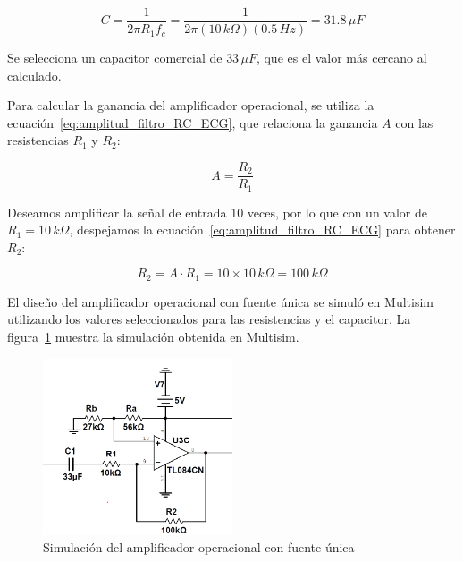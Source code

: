         \begin{equation}
            \label{eq:valor_capacitor}
            C = \frac{1}{2\pi R_1 f_c} = \frac{1}{2\pi (10\,k\Omega)(0.5\,Hz)} = 31.8\,\mu F
        \end{equation}

        Se selecciona un capacitor comercial de $33\,\mu F$, que es el valor más cercano al calculado.

        Para calcular la ganancia del amplificador operacional, se utiliza la ecuación~\ref{eq:amplitud_filtro_RC_ECG}, que relaciona la ganancia $A$ con las resistencias $R_1$ y $R_2$:

        \begin{equation}
            \label{eq:amplitud_filtro_RC_ECG}
            A = \frac{R_2}{R_1}
        \end{equation}

        Deseamos amplificar la señal de entrada 10 veces, por lo que con un valor de $R_1 = 10\,k\Omega$, despejamos la ecuación~\ref{eq:amplitud_filtro_RC_ECG} para obtener $R_2$:

        \begin{equation}
            \label{eq:valor_R2}
            R_2 = A \cdot R_1 = 10 \times 10\,k\Omega = 100\,k\Omega
        \end{equation}

        El diseño del amplificador operacional con fuente única se simuló en Multisim utilizando los valores seleccionados para las resistencias y el capacitor. La figura~\ref{fig:Simulacion_Amplificador_Con_Fuente_Unica} muestra la simulación obtenida en Multisim.


        \begin{figure}[H]
            \centering
            \includegraphics[width=0.5\textwidth]{img/Desarrollo/multisim_ampFuenteUnica.png}
            \caption[Simulación del amplificador operacional con fuente única.]{Simulación del amplificador operacional con fuente única\footnotemark}
            \label{fig:Simulacion_Amplificador_Con_Fuente_Unica}
        \end{figure}

